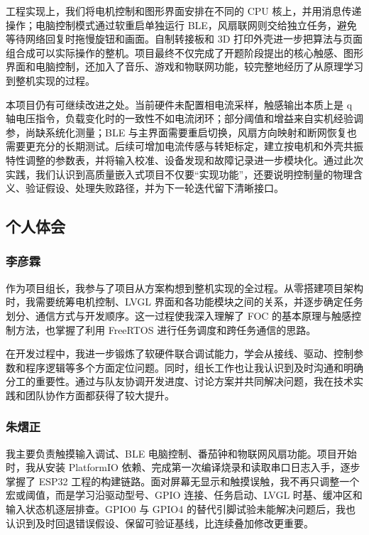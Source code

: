 \documentclass[12pt,a4paper,UTF8]{ctexart}
\begin{document}
工程实现上，我们将电机控制和图形界面安排在不同的 CPU 核上，并用消息传递操作；电脑控制模式通过软重启单独运行 BLE，风扇联网则交给独立任务，避免等待网络回复时拖慢旋钮和画面。自制转接板和 3D 打印外壳进一步把算法与页面组合成可以实际操作的整机。项目最终不仅完成了开题阶段提出的核心触感、图形界面和电脑控制，还加入了音乐、游戏和物联网功能，较完整地经历了从原理学习到整机实现的过程。

本项目仍有可继续改进之处。当前硬件未配置相电流采样，触感输出本质上是 q 轴电压指令，负载变化时的一致性不如电流闭环；部分阈值和增益来自实机经验调参，尚缺系统化测量；BLE 与主界面需要重启切换，风扇方向映射和断网恢复也需要更充分的长期测试。后续可增加电流传感与转矩标定，建立按电机和外壳共振特性调整的参数表，并将输入校准、设备发现和故障记录进一步模块化。通过此次实践，我们认识到高质量嵌入式项目不仅要“实现功能”，还要说明控制量的物理含义、验证假设、处理失败路径，并为下一轮迭代留下清晰接口。

\subsection{个人体会}

\subsubsection{李彦霖}

作为项目组长，我参与了项目从方案构想到整机实现的全过程。从零搭建项目架构时，我需要统筹电机控制、LVGL 界面和各功能模块之间的关系，并逐步确定任务划分、通信方式与开发顺序。这一过程使我深入理解了 FOC 的基本原理与触感控制方法，也掌握了利用 FreeRTOS 进行任务调度和跨任务通信的思路。

在开发过程中，我进一步锻炼了软硬件联合调试能力，学会从接线、驱动、控制参数和程序逻辑等多个方面定位问题。同时，组长工作也让我认识到及时沟通和明确分工的重要性。通过与队友协调开发进度、讨论方案并共同解决问题，我在技术实践和团队协作方面都获得了较大提升。

\subsubsection{朱熠正}

我主要负责触摸输入调试、BLE 电脑控制、番茄钟和物联网风扇功能。项目开始时，我从安装 PlatformIO 依赖、完成第一次编译烧录和读取串口日志入手，逐步掌握了 ESP32 工程的构建链路。面对屏幕无显示和触摸误触，我不再只调整一个宏或阈值，而是学习沿驱动型号、GPIO 连接、任务启动、LVGL 时基、缓冲区和输入状态机逐层排查。GPIO0 与 GPIO4 的替代引脚试验未能解决问题后，我也认识到及时回退错误假设、保留可验证基线，比连续叠加修改更重要。
\end{document}
